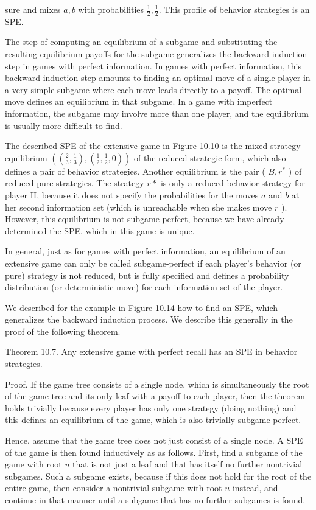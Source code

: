 \documentclass[12pt]{article}
\begin{document}
sure and mixes $a, b$ with probabilities $\frac{1}{2}, \frac{1}{2}$. This profile of behavior strategies is an SPE.

The step of computing an equilibrium of a subgame and substituting the resulting equilibrium payoffs for the subgame generalizes the backward induction step in games with perfect information. In games with perfect information, this backward induction step amounts to finding an optimal move of a single player in a very simple subgame where each move leads directly to a payoff. The optimal move defines an equilibrium in that subgame. In a game with imperfect information, the subgame may involve more than one player, and the equilibrium is usually more difficult to find.

The described SPE of the extensive game in Figure 10.10 is the mixed-strategy equilibrium $\left(\left(\frac{2}{3}, \frac{1}{3}\right),\left(\frac{1}{2}, \frac{1}{2}, 0\right)\right)$ of the reduced strategic form, which also defines a pair of behavior strategies. Another equilibrium is the pair ( $B, r^{*}$ ) of reduced pure strategies. The strategy $r *$ is only a reduced behavior strategy for player II, because it does not specify the probabilities for the moves $a$ and $b$ at her second information set (which is unreachable when she makes move $r$ ). However, this equilibrium is not subgame-perfect, because we have already determined the SPE, which in this game is unique.

In general, just as for games with perfect information, an equilibrium of an extensive game can only be called subgame-perfect if each player's behavior (or pure) strategy is not reduced, but is fully specified and defines a probability distribution (or deterministic move) for each information set of the player.

We described for the example in Figure 10.14 how to find an SPE, which generalizes the backward induction process. We describe this generally in the proof of the following theorem.

Theorem 10.7. Any extensive game with perfect recall has an SPE in behavior strategies.

Proof. If the game tree consists of a single node, which is simultaneously the root of the game tree and its only leaf with a payoff to each player, then the theorem holds trivially because every player has only one strategy (doing nothing) and this defines an equilibrium of the game, which is also trivially subgame-perfect.

Hence, assume that the game tree does not just consist of a single node. A SPE of the game is then found inductively as as follows. First, find a subgame of the game with root $u$ that is not just a leaf and that has itself no further nontrivial subgames. Such a subgame exists, because if this does not hold for the root of the entire game, then consider a nontrivial subgame with root $u$ instead, and continue in that manner until a subgame that has no further subgames is found.
\end{document}
